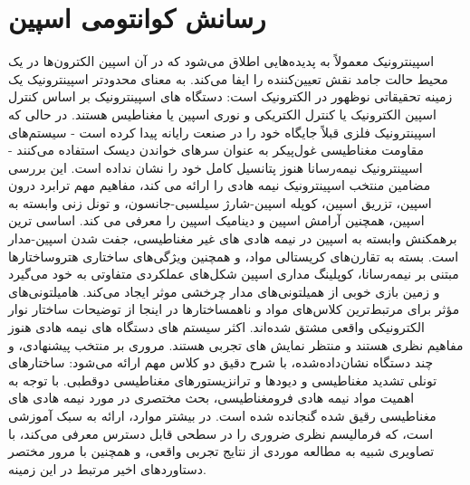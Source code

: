 \section{رسانش کوانتومی اسپین}
اسپینترونیک معمولاً به پدیده‌هایی اطلاق می‌شود که در آن اسپین الکترون‌ها در یک محیط حالت جامد نقش تعیین‌کننده را ایفا می‌کند. به معنای محدودتر اسپینترونیک یک زمینه تحقیقاتی نوظهور در الکترونیک است: دستگاه های اسپینترونیک بر اساس کنترل اسپین الکترونیک یا کنترل الکتریکی و نوری اسپین یا مغناطیس هستند. در حالی که اسپینترونیک فلزی قبلاً جایگاه خود را در صنعت رایانه پیدا کرده است - سیستم‌های مقاومت مغناطیسی غول‌پیکر به عنوان سرهای خواندن دیسک استفاده می‌کنند - اسپینترونیک نیمه‌رسانا هنوز پتانسیل کامل خود را نشان نداده است. این بررسی مضامین منتخب اسپینترونیک نیمه هادی را ارائه می کند، مفاهیم مهم ترابرد درون اسپین، تزریق اسپین، کوپله اسپین-شارژ سیلسبی-جانسون، و تونل زنی وابسته به اسپین، همچنین آرامش اسپین و دینامیک اسپین را معرفی می کند. اساسی ترین برهمکنش وابسته به اسپین در نیمه هادی های غیر مغناطیسی، جفت شدن اسپین-مدار است. بسته به تقارن‌های کریستالی مواد، و همچنین ویژگی‌های ساختاری هتروساختارها مبتنی بر نیمه‌رسانا، کوپلینگ مداری اسپین شکل‌های عملکردی متفاوتی به خود می‌گیرد و زمین بازی خوبی از همیلتونی‌های مدار چرخشی موثر ایجاد می‌کند. هامیلتونی‌های مؤثر برای مرتبط‌ترین کلاس‌های مواد و ناهمساختارها در اینجا از توضیحات ساختار نوار الکترونیکی واقعی مشتق شده‌اند. اکثر سیستم های دستگاه های نیمه هادی هنوز مفاهیم نظری هستند و منتظر نمایش های تجربی هستند. مروری بر منتخب پیشنهادی، و چند دستگاه نشان‌داده‌شده، با شرح دقیق دو کلاس مهم ارائه می‌شود: ساختارهای تونلی تشدید مغناطیسی و دیودها و ترانزیستورهای مغناطیسی دوقطبی. با توجه به اهمیت مواد نیمه هادی فرومغناطیسی، بحث مختصری در مورد نیمه هادی های مغناطیسی رقیق شده گنجانده شده است. در بیشتر موارد، ارائه به سبک آموزشی است، که فرمالیسم نظری ضروری را در سطحی قابل دسترس معرفی می‌کند، با تصاویری شبیه به مطالعه موردی از نتایج تجربی واقعی، و همچنین با مرور مختصر دستاوردهای اخیر مرتبط در این زمینه.


